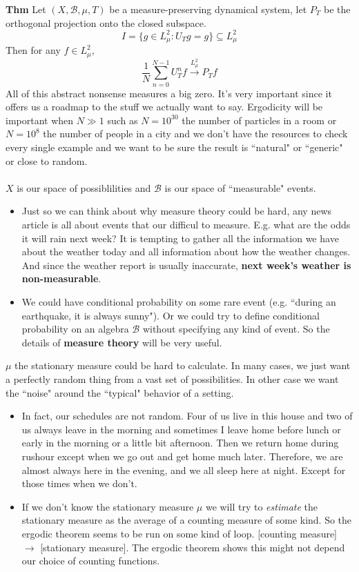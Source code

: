 \documentclass[12pt]{article}
\begin{document}
\textbf{Thm} Let $(X, \mathcal{B}, \mu, T)$ be a measure-preserving dynamical system, let $P_T$ be the orthogonal projection onto the closed subspace.  
$$ I = \{ g \in L_\mu^2 : U_T g = g \} \subseteq L_\mu^2  $$
Then for any $f \in L^2_\mu$, 
$$ \frac{1}{N}\sum_{n =0}^{N-1} U^n_T f \xrightarrow{L^2_\mu} P_T f$$
All of this abstract nonsense measures a big zero.  It's very important since it offers us a roadmap to the stuff we actually want to say.  Ergodicity will be important when $N \gg 1$ such as $N = 10^{30}$ the number of particles in a room or $N = 10^8$ the number of people in a city and we don't have the resources to check every single example and we want to be sure the result is ``natural" or ``generic" or close to random. \\ \\
$X$ is our space of possiblilities and $\mathcal{B}$ is our space of ``measurable" events. 
\begin{itemize}
\item Just so we can think about why measure theory could be hard, any news article is all about events that our difficul to measure.  E.g. what are the odds it will rain next week?  It is tempting to gather all the information we have about the weather today and all information about how the weather changes.  And since the weather report is usually inaccurate, \textbf{next week's weather is non-measurable}.
\item We could have conditional probability on some rare event (e.g. ``during an earthquake, it is always sunny").  Or we could try to define conditional probability on an algebra $\mathcal{B}$ without specifying any kind of event.  So the details of \textbf{measure theory} will be very useful.
\end{itemize}
$\mu$ the stationary measure could be hard to calculate.  In many cases, we just want a perfectly random thing from a vast set of possibilities.  In other case we want the ``noise" around the ``typical" behavior of a setting.  
\begin{itemize}
\item In fact, our schedules are not random.  Four of us live in this house and two of us always leave in the morning and sometimes I leave home before lunch or early in the morning or a little bit afternoon.  Then we return home during rushour except when we go out and get home much later.  Therefore, we are almost always here in the evening, and we all sleep here at night.  Except for those times when we don't.
\item If we don't know the stationary measure $\mu$ we will try to \textit{estimate} the stationary measure as the average of a counting measure of some kind.  So the ergodic theorem seems to be run on some kind of loop.  [counting measure] $\to$ [stationary measure].  The ergodic theorem shows this might not depend our choice of counting functions.
\end{itemize}
\end{document}

